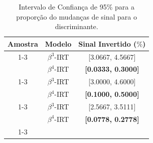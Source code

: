 

\begin{table}[!htb]
    \centering
\begin{tabular}{ccc}
\toprule
Amostra & Modelo &  Sinal Invertido ($\%$) \\
\cline{1-3}
\multirow[c]{2}{*}{$N = 100$, $M = 100$} & $\beta^3$-\gls{IRT} & [3.0667, 4.5667] \\
 & $\beta^4$-\gls{IRT} & \textbf{[0.0333, 0.3000]} \\
\cline{1-3}
\multirow[c]{2}{*}{$N = 100, M = 20$} & $\beta^3$-\gls{IRT} & [3.0000, 4.6000] \\
 & $\beta^4$-\gls{IRT} & \textbf{[0.1000, 0.5000]} \\
\cline{1-3}
\multirow[c]{2}{*}{$N = 300, M = 50$} & $\beta^3$-\gls{IRT} & [2.5667, 3.5111] \\
 & $\beta^4$-\gls{IRT} & \textbf{[0.0778, 0.2778]} \\
\cline{1-3}

\end{tabular}
    \caption{Intervalo de Confiança de 95\% para a proporção do mudanças de sinal para o discriminante.}
\label{tab:sign}
\end{table}







